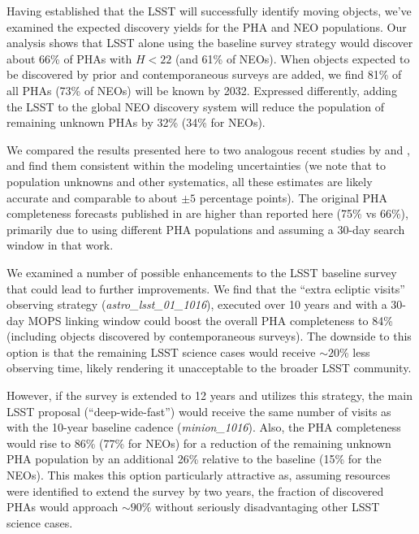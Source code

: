 
Having established that the LSST will successfully identify moving objects, we've examined the expected discovery yields for the PHA and NEO populations. Our analysis shows that LSST alone using the baseline survey strategy would discover about 66\% of PHAs with $H<22$ (and 61\% of NEOs). When objects expected to be discovered by prior and contemporaneous surveys are added, we find 81\% of all PHAs (73\% of NEOs) will be known by 2032. Expressed differently, adding the LSST to the global NEO discovery system will reduce the population of remaining unknown PHAs by 32\% (34\% for NEOs).

We compared the results presented here to two analogous recent studies by \citet[]{GMS2016} and \citet{VeresChesley2017neo}, and find them consistent within the modeling uncertainties (we note that to population unknowns and other systematics, all these estimates are likely accurate and comparable to about $\pm 5$ percentage points). The original PHA completeness forecasts published in \cite{IvezicNEO2007} are higher than reported here (75\% vs 66\%), primarily due to using different PHA populations and assuming a 30-day search window in that work.

We examined a number of possible enhancements to the LSST baseline survey that could lead to further improvements. We find that the ``extra ecliptic visits'' observing strategy ({\it astro\_lsst\_01\_1016}), executed over 10 years and with a 30-day MOPS linking window could boost the overall PHA completeness to 84\% (including objects discovered by contemporaneous surveys). The downside to this option is that the remaining LSST science cases would receive $\sim 20$\% less observing time, likely rendering it unacceptable to the broader LSST community. 

However, if the survey is extended to 12 years and utilizes this strategy, the main LSST proposal (``deep-wide-fast'') would receive the same number of visits as with the 10-year baseline cadence ({\it minion\_1016}). Also, the PHA completeness would rise to 86\% (77\% for NEOs) for a reduction of the remaining unknown PHA population by an additional 26\% relative to the baseline (15\% for the NEOs). This makes this option particularly attractive as, assuming resources were identified to extend the survey by two years, the fraction of discovered PHAs would approach $\sim 90$\% without seriously disadvantaging other LSST science cases.
